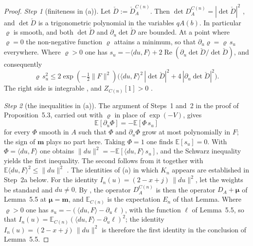 \documentclass[11pt,letterpaper,reqno]{amsart}
\theoremstyle{definition}
\begin{document}
\begin{proof}
\emph{Step 1} (finiteness in (a)).
Let $\check D:=\check D^{C(n)}_A$.
Then $\det D^{C(n)}_A=|\det\check D|^2$ \cite[Proposition~3.18\,(d)]{QEDII}, and $\det\check D$ is a trigonometric polynomial in the variables $qA(b)$.
In particular $\varrho$ is smooth, and both $\det\check D$ and $\partial_u\det\check D$ are bounded.
At a point where $\varrho=0$ the non-negative function $\varrho$ attains a minimum, so that $\partial_u\varrho=\varrho\,s_u$ everywhere.
Where $\varrho>0$ one has $s_u=\allowbreak -\langle du,\allowbreak F\rangle+2\operatorname{Re}(\partial_u\det\check D/\det\check D)$, and consequently
\begin{equation*}
\varrho\,s_u^2\le2\exp(-\tfrac12\|F\|^2)\bigl(\langle du,F\rangle^2\,|\det\check D|^2+4\,|\partial_u\det\check D|^2\bigr).
\end{equation*}
The right side is integrable \cite[Lemma~3.14]{QEDII}, and $Z_{C(n)}[1]>0$ \cite[Theorem~4.26]{QEDII}.

\emph{Step 2} (the inequalities in (a)).
The argument of Steps~1 and~2 in the proof of Proposition~5.3, carried out with $\varrho$ in place of $\exp(-V)$, gives
\begin{equation*}
\mathbb E[\partial_u\Phi]=-\mathbb E[\Phi\,s_u]
\end{equation*}
for every $\Phi$ smooth in $A$ such that $\Phi$ and $\partial_u\Phi$ grow at most polynomially in $F$; the sign of $\mathbf m$ plays no part here.
Taking $\Phi=1$ one finds $\mathbb E[s_u]=0$.
With $\Phi=\langle du,F\rangle$ one obtains $\|du\|^2=-\mathbb E[\langle du,F\rangle\,s_u]$, and the Schwarz inequality yields the first inequality.
The second follows from it together with $\mathbb E\langle du,F\rangle^2\le\|du\|^2$ \cite[Theorem~6.27\,(b)]{QEDII}.
The identities of (a) in which $K_n$ appears are established in Step~2a below.
For the identity $I_n(u)=(2-x+j)\,\|du\|^2$, let the weights be standard and $du\ne0$.
By \cite[(I.2.5), Proposition~46\,(b)]{QEDIII}, the operator $D^{C(n)}_A$ is then the operator $D_A+\boldsymbol\mu$ of Lemma~5.5 at $\boldsymbol\mu=\mathbf m$, and $\mathbb E_{C(n)}$ is the expectation $E_n$ of that Lemma.
Where $\varrho>0$ one has $s_u=-(\langle du,F\rangle-\partial_u\ell)$, with the function $\ell$ of Lemma~5.5, so that $I_n(u)=\mathbb E_{C(n)}(\langle du,F\rangle-\partial_u\ell)^2$; the identity $I_n(u)=(2-x+j)\,\|du\|^2$ is therefore the first identity in the conclusion of Lemma~5.5.


\end{proof}
\end{document}
